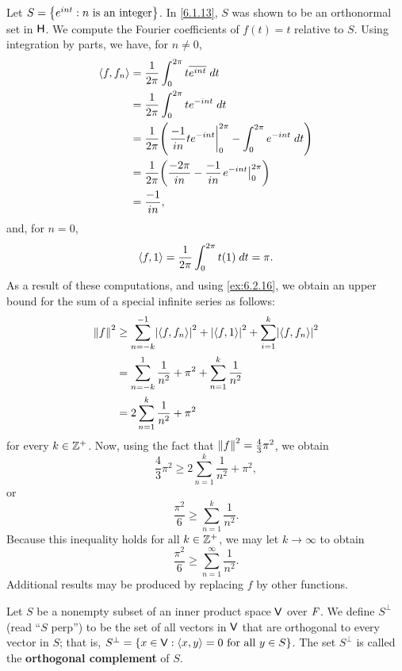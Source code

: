 \begin{eg}\label{6.2.8}
  Let \(S = \left\lbrace e^{int} : n \text{ is an integer}\right\rbrace\).
  In \cref{6.1.13}, \(S\) was shown to be an orthonormal set in \(\mathsf{H}\).
  We compute the Fourier coefficients of \(f(t) = t\) relative to \(S\).
  Using integration by parts, we have, for \(n \neq 0\),
  \begin{align*}
    \inn{f, f_n} & = \frac{1}{2\pi} \int_0^{2\pi} t \conj{e^{int}} \; dt                                         \\
                 & = \frac{1}{2\pi} \int_0^{2\pi} t e^{-int} \; dt                                               \\
                 & = \frac{1}{2\pi} \pa{\eval{\frac{-1}{in} t e^{-int}}_0^{2\pi} - \int_0^{2\pi} e^{-int} \; dt} \\
                 & = \frac{1}{2\pi} \pa{\frac{-2\pi}{in} - \frac{-1}{in} \eval{e^{-int}}_0^{2\pi}}               \\
                 & = \frac{-1}{in},
  \end{align*}
  and, for \(n = 0\),
  \[
    \left\langle f, 1\right\rangle = \frac{1}{2\pi} \int_0^{2\pi} t(1) \; dt = \pi.
  \]
  As a result of these computations, and using \cref{ex:6.2.16}, we obtain an upper bound for the sum of a special infinite series as follows:
  \begin{align*}
    \norm{f}^2 & \geq \sum_{n = -k}^{-1} \abs{\inn{f, f_n}}^2 + \abs{\inn{f, 1}}^2 + \sum_{i = 1}^k \abs{\inn{f, f_n}}^2 \\
               & = \sum_{n = -k}^1 \frac{1}{n^2} + \pi^2 + \sum_{n = 1}^k \frac{1}{n^2}                                  \\
               & = 2 \sum_{n = 1}^k \frac{1}{n^2} + \pi^2
  \end{align*}
  for every \(k \in \mathbb{Z}^+\).
  Now, using the fact that \(\left\lVert f\right\rVert^2 = \frac{4}{3} \pi^2\), we obtain
  \[
    \frac{4}{3} \pi^2 \geq 2 \sum_{n = 1}^k \frac{1}{n^2} + \pi^2,
  \]
  or
  \[
    \frac{\pi^2}{6} \geq \sum_{n = 1}^k \frac{1}{n^2}.
  \]
  Because this inequality holds for all \(k \in \mathbb{Z}^+\), we may let \(k \to \infty\) to obtain
  \[
    \frac{\pi^2}{6} \geq \sum_{n = 1}^\infty \frac{1}{n^2}.
  \]
  Additional results may be produced by replacing \(f\) by other functions.
\end{eg}

\begin{defn}\label{6.2.9}
  Let \(S\) be a nonempty subset of an inner product space \(\mathsf{V}\) over \(\mathit{F}\).
  We define \(S^{\perp}\) (read ``\(S\) perp'') to be the set of all vectors in \(\mathsf{V}\) that are orthogonal to every vector in \(S\);
  that is, \(S^{\perp} = \left\lbrace x \in \mathsf{V} : \left\langle x, y\right\rangle = 0 \text{ for all } y \in S\right\rbrace\).
  The set \(S^{\perp}\) is called the \textbf{orthogonal complement} of \(S\).
\end{defn}

